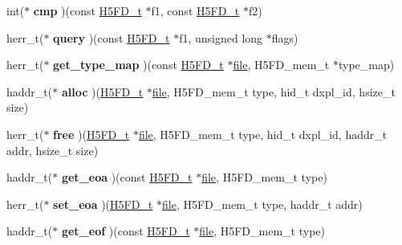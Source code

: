 \begin{DoxyCompactItemize}
int($\ast$ {\bfseries cmp} )(const \hyperlink{struct_h5_f_d__t}{H5\+F\+D\+\_\+t} $\ast$f1, const \hyperlink{struct_h5_f_d__t}{H5\+F\+D\+\_\+t} $\ast$f2)
\item 
\mbox{\label{struct_h5_f_d__class__t_a70403e3f696565f3a2740c30dcbab811}} 
herr\+\_\+t($\ast$ {\bfseries query} )(const \hyperlink{struct_h5_f_d__t}{H5\+F\+D\+\_\+t} $\ast$f1, unsigned long $\ast$flags)
\item 
\mbox{\label{struct_h5_f_d__class__t_a4a0b91a0155850093332bf70a3f55d9c}} 
herr\+\_\+t($\ast$ {\bfseries get\+\_\+type\+\_\+map} )(const \hyperlink{struct_h5_f_d__t}{H5\+F\+D\+\_\+t} $\ast$\hyperlink{structfile}{file}, H5\+F\+D\+\_\+mem\+\_\+t $\ast$type\+\_\+map)
\item 
\mbox{\label{struct_h5_f_d__class__t_ad407529087b1ebb4f0f404028356fa1d}} 
haddr\+\_\+t($\ast$ {\bfseries alloc} )(\hyperlink{struct_h5_f_d__t}{H5\+F\+D\+\_\+t} $\ast$\hyperlink{structfile}{file}, H5\+F\+D\+\_\+mem\+\_\+t type, hid\+\_\+t dxpl\+\_\+id, hsize\+\_\+t size)
\item 
\mbox{\label{struct_h5_f_d__class__t_adea72e0f74f0f0ca4dfabcf023844ba0}} 
herr\+\_\+t($\ast$ {\bfseries free} )(\hyperlink{struct_h5_f_d__t}{H5\+F\+D\+\_\+t} $\ast$\hyperlink{structfile}{file}, H5\+F\+D\+\_\+mem\+\_\+t type, hid\+\_\+t dxpl\+\_\+id, haddr\+\_\+t addr, hsize\+\_\+t size)
\item 
\mbox{\label{struct_h5_f_d__class__t_ababbbd833b2b4f67a4af06b7460b50c9}} 
haddr\+\_\+t($\ast$ {\bfseries get\+\_\+eoa} )(const \hyperlink{struct_h5_f_d__t}{H5\+F\+D\+\_\+t} $\ast$\hyperlink{structfile}{file}, H5\+F\+D\+\_\+mem\+\_\+t type)
\item 
\mbox{\label{struct_h5_f_d__class__t_af7853fc66c382022c8ef7c63738b16f4}} 
herr\+\_\+t($\ast$ {\bfseries set\+\_\+eoa} )(\hyperlink{struct_h5_f_d__t}{H5\+F\+D\+\_\+t} $\ast$\hyperlink{structfile}{file}, H5\+F\+D\+\_\+mem\+\_\+t type, haddr\+\_\+t addr)
\item 
\mbox{\label{struct_h5_f_d__class__t_a4ab050d15aee915935d77f091396ef4b}} 
haddr\+\_\+t($\ast$ {\bfseries get\+\_\+eof} )(const \hyperlink{struct_h5_f_d__t}{H5\+F\+D\+\_\+t} $\ast$\hyperlink{structfile}{file}, H5\+F\+D\+\_\+mem\+\_\+t type)

\end{DoxyCompactItemize}

